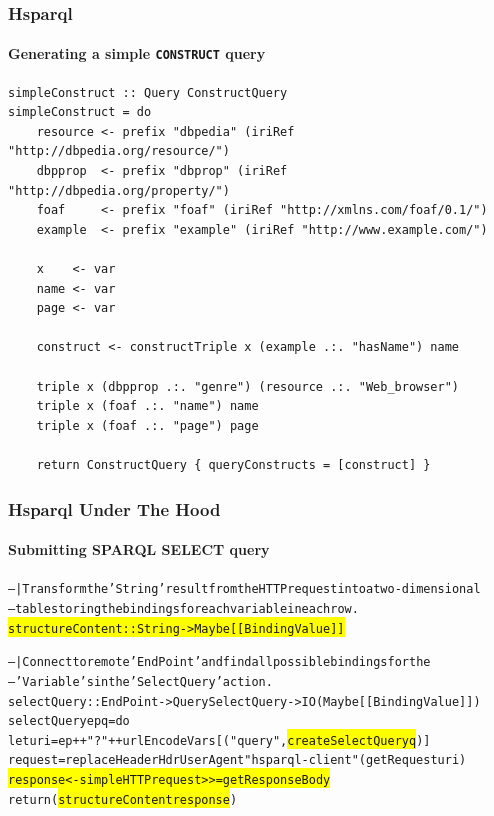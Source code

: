 \documentclass{beamer}
\newcommand{\hilightyellow}[1]{\colorbox{yellow}{#1}}
\begin{document}
\begin{frame}[fragile]
\frametitle{Hsparql}
\framesubtitle{Generating a simple \texttt{CONSTRUCT} query}

\scriptsize
\begin{verbatim}
simpleConstruct :: Query ConstructQuery
simpleConstruct = do
    resource <- prefix "dbpedia" (iriRef "http://dbpedia.org/resource/")
    dbpprop  <- prefix "dbprop" (iriRef "http://dbpedia.org/property/")
    foaf     <- prefix "foaf" (iriRef "http://xmlns.com/foaf/0.1/")
    example  <- prefix "example" (iriRef "http://www.example.com/")

    x    <- var
    name <- var
    page <- var

    construct <- constructTriple x (example .:. "hasName") name
    
    triple x (dbpprop .:. "genre") (resource .:. "Web_browser")
    triple x (foaf .:. "name") name
    triple x (foaf .:. "page") page

    return ConstructQuery { queryConstructs = [construct] }
\end{verbatim}
\end{frame}


\begin{frame}[fragile]
\frametitle{Hsparql Under The Hood}
\framesubtitle{Submitting SPARQL SELECT query}

\scriptsize
\begin{alltt}
-- |Transform the 'String' result from the HTTP request into a two-dimensional
--  table storing the bindings for each variable in each row.
\hilightyellow{structureContent :: String -> Maybe [[BindingValue]]}

-- |Connect to remote 'EndPoint' and find all possible bindings for the
--  'Variable's in the 'SelectQuery' action.
selectQuery :: EndPoint -> Query SelectQuery -> IO (Maybe [[BindingValue]])
selectQuery ep q = do
    let uri      = ep ++ "?" ++ urlEncodeVars [("query", \hilightyellow{createSelectQuery q})]
        request  = replaceHeader HdrUserAgent "hsparql-client" (getRequest uri)
    \hilightyellow{response <- simpleHTTP request >>= getResponseBody}
    return (\hilightyellow{structureContent response})
\end{alltt}

\end{frame}
\end{document}
